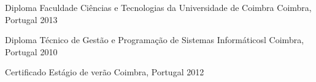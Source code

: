 




\begin{cvhonors}


\cvhonor
{Diploma} %
{Faculdade Ciências e Tecnologias da Universidade de Coimbra} %
{Coimbra, Portugal} %
{2013} %


\cvhonor
{Diploma} %
{Técnico de Gestão e Programação de Sistemas Informáticosl} %
{Coimbra, Portugal} %
{2010} %


\cvhonor 
{Certificado} %
{Estágio de verão} %
{Coimbra, Portugal} %
{2012} %



\end{cvhonors}








